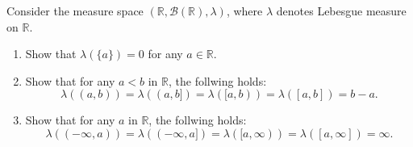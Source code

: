 \documentclass{article}
\begin{document}
\begin{exe}
    Consider the measure space $(\mathbb{R},\mathcal{B}(\mathbb{R}),\lambda)$, where $\lambda $ denotes Lebesgue measure on $\mathbb{R}$.
    \begin{enumerate}
        \item Show that $\lambda(\{a\})=0 $ for any $a\in \mathbb{R}.$  
        \item Show that for any $a<b$ in $\mathbb{R}$, the follwing holds:
            \[
                \lambda((a,b))=\lambda((a,b])=\lambda([a,b))=\lambda([a,b])=b-a
            .\] 
        \item Show that for any $a$ in $\mathbb{R}$, the follwing holds:
            \[
                \lambda((-\infty,a))=\lambda((-\infty,a])=\lambda([a,\infty))=\lambda([a,\infty])=\infty
            .\] 
    \end{enumerate}
\end{exe}
\end{document}
